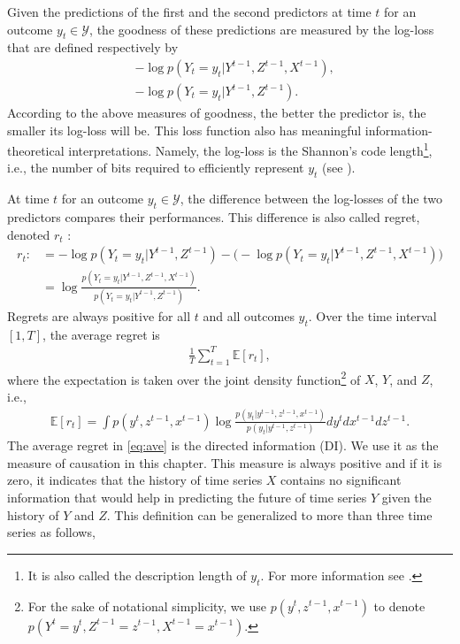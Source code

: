 Given the predictions of the first and the second predictors at time $t$ for an outcome $y_t\in \mathcal{Y}$, the goodness of these predictions are measured by the log-loss that are defined respectively by 
\begin{align*}
    &-\log p(Y_t=y_t|Y^{t-1},Z^{t-1},X^{t-1}),\\
    &-\log p(Y_t=y_t|Y^{t-1},Z^{t-1}).
\end{align*}
According to the above measures of goodness, the better the predictor is, the smaller its log-loss will be.
This loss function also has meaningful information-theoretical interpretations.
Namely, the log-loss is the Shannon's code length\footnote{It is also called the description length of $y_t$. For more information see \citet{cover2012elements}.}, i.e., the number of bits required to efficiently represent $y_t$ (see \citet{etesami2018econometric}). 

At time $t$ for an outcome $y_t\in \mathcal{Y}$, the difference between the log-losses of the two predictors compares their performances.  This difference is also called regret, denoted $r_t$ :
\begin{align}
r_t:&=-\log{p(Y_t=y_t|Y^{t-1},Z^{t-1})}-\big(-\log {p(Y_t=y_t|Y^{t-1},Z^{t-1},X^{t-1})}\big) \nonumber \\
&=\log \frac{p(Y_t=y_t|Y^{t-1},Z^{t-1},X^{t-1})}{p(Y_t=y_t|Y^{t-1},Z^{t-1})}.
\end{align}
Regrets are always positive for all $t$ and all outcomes $y_t$.
Over the time interval $[1,T]$, the average regret is
\begin{align}\label{eq:ave}
   \frac{1}{T}\sum_{t=1}^T \mathbb{E}[r_t],
\end{align}
where the expectation is taken over the joint density function\footnote{For the sake of notational simplicity, we use $p(y^{t},z^{t-1},x^{t-1})$ to denote $p(Y^{t}=y^{t},Z^{t-1}=z^{t-1},X^{t-1}=x^{t-1})$.} of $X$, $Y$, and $Z$, i.e., 
\begin{align}
    \mathbb{E}[r_t]=\int p(y^{t},z^{t-1},x^{t-1})\log \frac{p(y_t|y^{t-1},z^{t-1},x^{t-1})}{p(y_t|y^{t-1},z^{t-1})}dy^tdx^{t-1}dz^{t-1}.
\end{align}
The average regret in \eqref{eq:ave} is the directed information (DI). We use it as the measure of causation in this chapter.
This measure is always positive and if it is zero, it indicates that the history of time series $X$ contains no significant information that would help in predicting the future of time series $Y$ given the history of $Y$ and $Z$. 
This definition can be generalized to more than three time series as follows,

